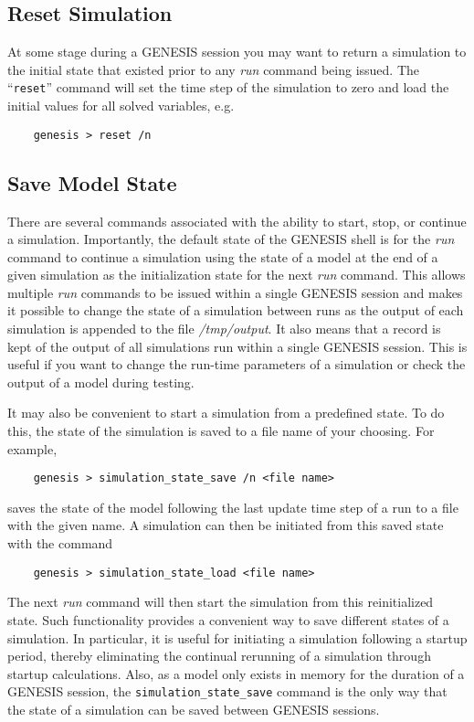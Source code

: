 \documentclass[12pt]{article}
\begin{document}
\subsection*{Reset Simulation}

At some stage during a GENESIS session you may want to return a simulation to the initial state that existed prior to any {\it run} command being issued. The ``{\tt reset}'' command will set the time step of the simulation to zero and load the initial values for all solved variables, e.g.
\begin{verbatim}
    genesis > reset /n
\end{verbatim}

\subsection*{Save Model State}

There are several commands associated with the ability to start, stop, or continue a simulation. Importantly, the default state of the GENESIS shell is for the {\it run} command to continue a simulation using the state of a model at the end of a given simulation as the initialization state for the next {\it run} command. This allows multiple {\it run} commands to be issued within a single GENESIS session and makes it possible to change the state of a simulation between runs as the output of each simulation is appended to the file {\it /tmp/output}. It also means that a record is kept of the output of all simulations run within a single GENESIS session. This is useful if you want to change the run-time parameters of a simulation or check the output of a model during testing.

It may also be convenient to start a simulation from a predefined state. To do this, the state of the simulation is saved to a file name of your choosing. For example,
\begin{verbatim}
    genesis > simulation_state_save /n <file name>
\end{verbatim}
saves the state of the model following the last update time step of a run to a file with the given name. A simulation can then be initiated from this saved state with the command 
\begin{verbatim}
    genesis > simulation_state_load <file name>
\end{verbatim}
The next {\it run} command will then start the simulation from this reinitialized state. Such functionality provides a convenient way to save different states of a simulation. In particular, it is useful for initiating a simulation following a startup period, thereby eliminating the continual rerunning of a simulation through startup calculations. Also, as a model only exists in memory for the duration of a GENESIS session, the {\tt simulation\_state\_save} command  is the only way that the state of a simulation can be saved between GENESIS sessions.
\end{document}
